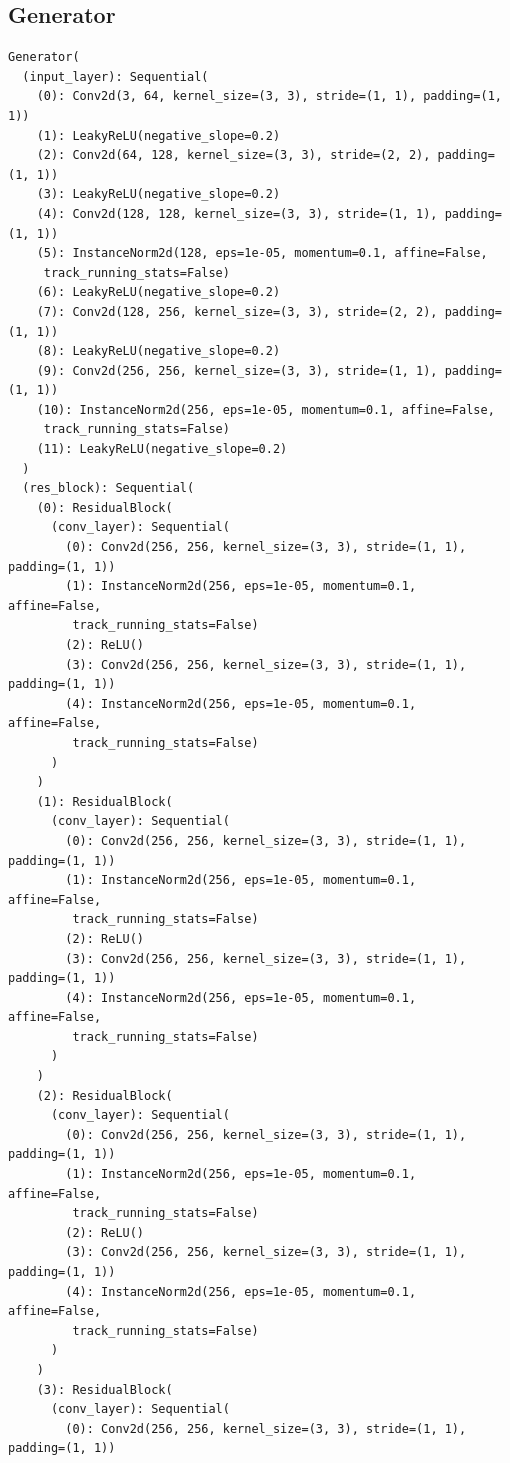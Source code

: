 \documentclass{article}
\begin{document}
\subsection*{Generator}
\begin{verbatim}
Generator(
  (input_layer): Sequential(
    (0): Conv2d(3, 64, kernel_size=(3, 3), stride=(1, 1), padding=(1, 1))
    (1): LeakyReLU(negative_slope=0.2)
    (2): Conv2d(64, 128, kernel_size=(3, 3), stride=(2, 2), padding=(1, 1))
    (3): LeakyReLU(negative_slope=0.2)
    (4): Conv2d(128, 128, kernel_size=(3, 3), stride=(1, 1), padding=(1, 1))
    (5): InstanceNorm2d(128, eps=1e-05, momentum=0.1, affine=False,
     track_running_stats=False)
    (6): LeakyReLU(negative_slope=0.2)
    (7): Conv2d(128, 256, kernel_size=(3, 3), stride=(2, 2), padding=(1, 1))
    (8): LeakyReLU(negative_slope=0.2)
    (9): Conv2d(256, 256, kernel_size=(3, 3), stride=(1, 1), padding=(1, 1))
    (10): InstanceNorm2d(256, eps=1e-05, momentum=0.1, affine=False,
     track_running_stats=False)
    (11): LeakyReLU(negative_slope=0.2)
  )
  (res_block): Sequential(
    (0): ResidualBlock(
      (conv_layer): Sequential(
        (0): Conv2d(256, 256, kernel_size=(3, 3), stride=(1, 1), padding=(1, 1))
        (1): InstanceNorm2d(256, eps=1e-05, momentum=0.1, affine=False,
         track_running_stats=False)
        (2): ReLU()
        (3): Conv2d(256, 256, kernel_size=(3, 3), stride=(1, 1), padding=(1, 1))
        (4): InstanceNorm2d(256, eps=1e-05, momentum=0.1, affine=False,
         track_running_stats=False)
      )
    )
    (1): ResidualBlock(
      (conv_layer): Sequential(
        (0): Conv2d(256, 256, kernel_size=(3, 3), stride=(1, 1), padding=(1, 1))
        (1): InstanceNorm2d(256, eps=1e-05, momentum=0.1, affine=False,
         track_running_stats=False)
        (2): ReLU()
        (3): Conv2d(256, 256, kernel_size=(3, 3), stride=(1, 1), padding=(1, 1))
        (4): InstanceNorm2d(256, eps=1e-05, momentum=0.1, affine=False,
         track_running_stats=False)
      )
    )
    (2): ResidualBlock(
      (conv_layer): Sequential(
        (0): Conv2d(256, 256, kernel_size=(3, 3), stride=(1, 1), padding=(1, 1))
        (1): InstanceNorm2d(256, eps=1e-05, momentum=0.1, affine=False,
         track_running_stats=False)
        (2): ReLU()
        (3): Conv2d(256, 256, kernel_size=(3, 3), stride=(1, 1), padding=(1, 1))
        (4): InstanceNorm2d(256, eps=1e-05, momentum=0.1, affine=False,
         track_running_stats=False)
      )
    )
    (3): ResidualBlock(
      (conv_layer): Sequential(
        (0): Conv2d(256, 256, kernel_size=(3, 3), stride=(1, 1), padding=(1, 1))

\end{verbatim}
\end{document}
